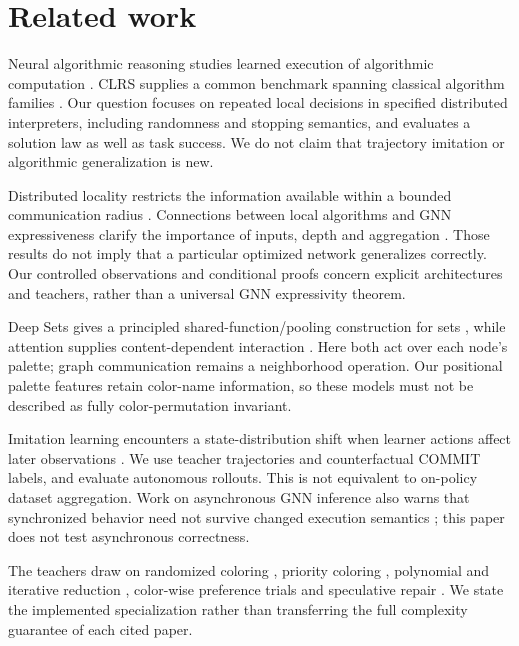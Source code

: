 \documentclass[
  11pt,
]{article}
\begin{document}
\section{Related work}\label{related-work}

Neural algorithmic reasoning studies learned execution of algorithmic
computation \citep{velickovic2021nar}. CLRS supplies a common benchmark
spanning classical algorithm families \citep{velickovic2022clrs}. Our
question focuses on repeated local decisions in specified distributed
interpreters, including randomness and stopping semantics, and evaluates
a solution law as well as task success. We do not claim that trajectory
imitation or algorithmic generalization is new.

Distributed locality restricts the information available within a
bounded communication radius \citep{linial1992locality}. Connections
between local algorithms and GNN expressiveness clarify the importance
of inputs, depth and aggregation
\citep{sato2019approximation, loukas2020depth}. Those results do not
imply that a particular optimized network generalizes correctly. Our
controlled observations and conditional proofs concern explicit
architectures and teachers, rather than a universal GNN expressivity
theorem.

Deep Sets gives a principled shared-function/pooling construction for
sets \citep{zaheer2017sets}, while attention supplies content-dependent
interaction \citep{vaswani2017attention}. Here both act over each node's
palette; graph communication remains a neighborhood operation. Our
positional palette features retain color-name information, so these
models must not be described as fully color-permutation invariant.

Imitation learning encounters a state-distribution shift when learner
actions affect later observations \citep{ross2011dagger}. We use teacher
trajectories and counterfactual COMMIT labels, and evaluate autonomous
rollouts. This is not equivalent to on-policy dataset aggregation. Work
on asynchronous GNN inference also warns that synchronized behavior need
not survive changed execution semantics \citep{solodova2025hogwild};
this paper does not test asynchronous correctness.

The teachers draw on randomized coloring
\citep{luby1993randomness, johansson1999coloring}, priority coloring
\citep{jones1993parallel}, polynomial and iterative reduction
\citep{linial1992locality, kuhn2006complexity, barenboim2008linear},
color-wise preference trials \citep{schneider2010symmetry} and
speculative repair \citep{gebremedhin2000scalable}. We state the
implemented specialization rather than transferring the full complexity
guarantee of each cited paper.
\end{document}
